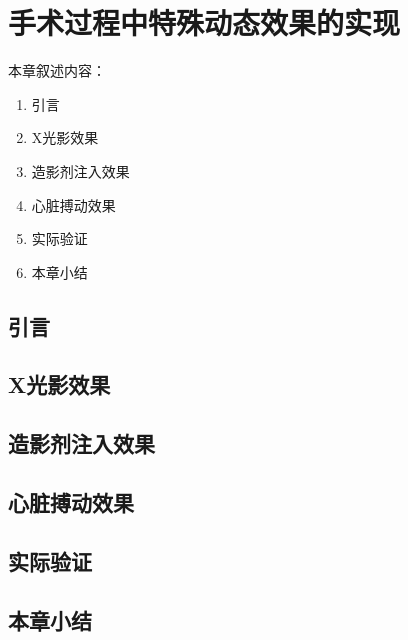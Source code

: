\chapter{手术过程中特殊动态效果的实现}
\label{chap6}

本章叙述内容：
\begin{enumerate}
  \item 引言
  \item X光影效果
  \item 造影剂注入效果
  \item 心脏搏动效果
  \item 实际验证
  \item 本章小结
\end{enumerate}

\section{引言}

\section{X光影效果}
\label{sec6.2}

\section{造影剂注入效果}

\section{心脏搏动效果}

\section{实际验证}

\section{本章小结} 